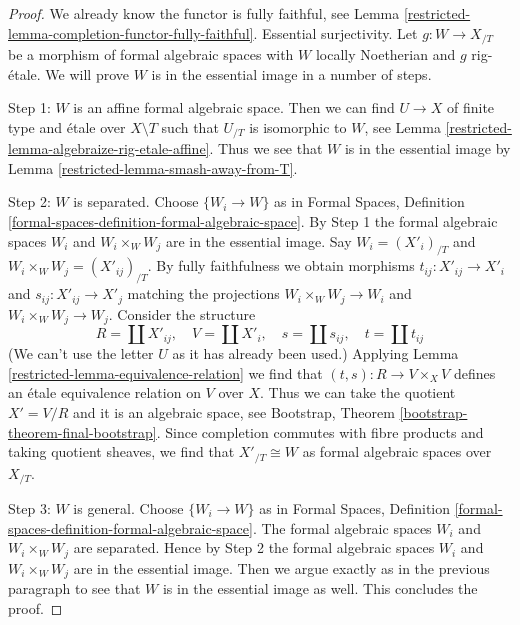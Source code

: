 \begin{proof}

We already know the functor is fully faithful, see
Lemma \ref{restricted-lemma-completion-functor-fully-faithful}.
Essential surjectivity. Let $g : W \to X_{/T}$ be a morphism
of formal algebraic spaces with $W$ locally Noetherian
and $g$ rig-\'etale. We will prove $W$ is in the essential
image in a number of steps.

\medskip\noindent
Step 1: $W$ is an affine formal algebraic space. Then we can find
$U \to X$ of finite type and \'etale over $X \setminus T$ such that
$U_{/T}$ is isomorphic to $W$, see
Lemma \ref{restricted-lemma-algebraize-rig-etale-affine}.
Thus we see that $W$ is in the essential image by
Lemma \ref{restricted-lemma-smash-away-from-T}.

\medskip\noindent
Step 2: $W$ is separated. Choose $\{W_i \to W\}$ as in
Formal Spaces, Definition \ref{formal-spaces-definition-formal-algebraic-space}.
By Step 1 the formal algebraic spaces $W_i$ and $W_i \times_W W_j$
are in the essential image.
Say $W_i = (X'_i)_{/T}$ and $W_i \times_W W_j = (X'_{ij})_{/T}$.
By fully faithfulness we obtain morphisms $t_{ij} : X'_{ij} \to X'_i$
and $s_{ij} : X'_{ij} \to X'_j$ matching the projections
$W_i \times_W W_j \to W_i$ and $W_i \times_W W_j \to W_j$.
Consider the structure
$$
R = \coprod X'_{ij},\quad
V = \coprod X'_i,\quad
s = \coprod s_{ij},\quad
t = \coprod t_{ij}
$$
(We can't use the letter $U$ as it has already been used.)
Applying Lemma \ref{restricted-lemma-equivalence-relation} we find that
$(t, s) : R \to V \times_X V$ defines an \'etale equivalence relation
on $V$ over $X$. Thus we can take the quotient $X' = V/R$ and
it is an algebraic space, see
Bootstrap, Theorem \ref{bootstrap-theorem-final-bootstrap}.
Since completion commutes with fibre products and taking
quotient sheaves, we find that
$X'_{/T} \cong W$ as formal algebraic spaces over $X_{/T}$.

\medskip\noindent
Step 3: $W$ is general. Choose $\{W_i \to W\}$ as in
Formal Spaces, Definition \ref{formal-spaces-definition-formal-algebraic-space}.
The formal algebraic spaces $W_i$ and $W_i \times_W W_j$ are separated.
Hence by Step 2  the formal algebraic spaces $W_i$ and $W_i \times_W W_j$
are in the essential image. Then we argue exactly as in the previous
paragraph to see that $W$ is in the essential image as well.
This concludes the proof.
\end{proof}

